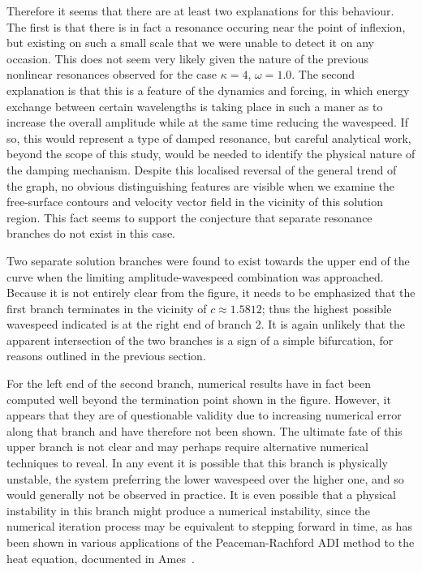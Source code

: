 Therefore it seems that there are at least two explanations for this behaviour. The first is that there is in fact a resonance occuring near the point of inflexion, but existing on such a small scale that we were unable to detect it on any occasion. This does not seem very likely given the nature of the previous nonlinear resonances observed for the case $\kappa=4$, $\omega=1.0$. The second explanation is that this is a feature of the dynamics and forcing, in which energy exchange between certain wavelengths is taking place in such a maner as to increase the overall amplitude while at the same time reducing the wavespeed. If so, this would represent a type of damped resonance, but careful analytical work, beyond the scope of this study, would be needed to identify the physical nature of the damping mechanism. Despite this localised reversal of the general trend of the graph, no obvious distinguishing features are visible when we examine the free-surface contours and velocity vector field in the vicinity of this solution region. This fact seems to support the conjecture that separate resonance branches do not exist in this case.

Two separate solution branches were found to exist towards the upper end of the curve when the limiting amplitude-wavespeed combination was approached. Because it is not entirely clear from the figure, it needs to be emphasized that the first branch terminates in the vicinity of $c\approx1.5812$; thus the highest possible wavespeed indicated is at the right end of branch 2. It is again unlikely that the apparent intersection of the two branches is a sign of a simple bifurcation, for reasons outlined in the previous section.

For the left end of the second branch, numerical results have in fact been computed well beyond the termination point shown in the figure. However, it appears that they are of questionable validity due to increasing numerical error along that branch and have therefore not been shown. The ultimate fate of this upper branch is not clear and may perhaps require alternative numerical techniques to reveal. In any event it is possible that this branch is physically unstable, the system preferring the lower wavespeed over the higher one, and so would generally not be observed in practice. It is even possible that a physical instability in this branch might produce a numerical instability, since the numerical iteration process may be equivalent to stepping forward in time, as has been shown in various applications of the Peaceman-Rachford ADI method to the heat equation, documented in Ames~\cite[page 149]{Ames:NMP}.

